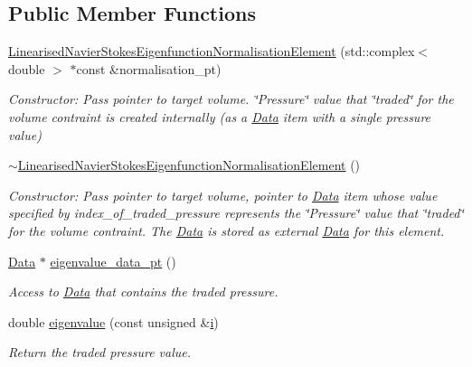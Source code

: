 \subsection*{Public Member Functions}
\begin{DoxyCompactItemize}
\item 
\hyperlink{classoomph_1_1LinearisedNavierStokesEigenfunctionNormalisationElement_a38ea9510f1bb602fa2d633f8dd2506de}{Linearised\+Navier\+Stokes\+Eigenfunction\+Normalisation\+Element} (std\+::complex$<$ double $>$ $\ast$const \&normalisation\+\_\+pt)
\begin{DoxyCompactList}\small\item\em Constructor\+: Pass pointer to target volume. \char`\"{}\+Pressure\char`\"{} value that \char`\"{}traded\char`\"{} for the volume contraint is created internally (as a \hyperlink{classoomph_1_1Data}{Data} item with a single pressure value) \end{DoxyCompactList}\item 
\hyperlink{classoomph_1_1LinearisedNavierStokesEigenfunctionNormalisationElement_aa4f7bbda23fcf498f79b5e18c4a96f3b}{$\sim$\+Linearised\+Navier\+Stokes\+Eigenfunction\+Normalisation\+Element} ()
\begin{DoxyCompactList}\small\item\em Constructor\+: Pass pointer to target volume, pointer to \hyperlink{classoomph_1_1Data}{Data} item whose value specified by index\+\_\+of\+\_\+traded\+\_\+pressure represents the \char`\"{}\+Pressure\char`\"{} value that \char`\"{}traded\char`\"{} for the volume contraint. The \hyperlink{classoomph_1_1Data}{Data} is stored as external \hyperlink{classoomph_1_1Data}{Data} for this element. \end{DoxyCompactList}\item 
\hyperlink{classoomph_1_1Data}{Data} $\ast$ \hyperlink{classoomph_1_1LinearisedNavierStokesEigenfunctionNormalisationElement_a4fd5c2630dc1fdf106791c4dfca7eef2}{eigenvalue\+\_\+data\+\_\+pt} ()
\begin{DoxyCompactList}\small\item\em Access to \hyperlink{classoomph_1_1Data}{Data} that contains the traded pressure. \end{DoxyCompactList}\item 
double \hyperlink{classoomph_1_1LinearisedNavierStokesEigenfunctionNormalisationElement_a6813414a2848d332d50029de27b30d01}{eigenvalue} (const unsigned \&\hyperlink{cfortran_8h_adb50e893b86b3e55e751a42eab3cba82}{i})
\begin{DoxyCompactList}\small\item\em Return the traded pressure value. \end{DoxyCompactList}\item 

\end{DoxyCompactItemize}
